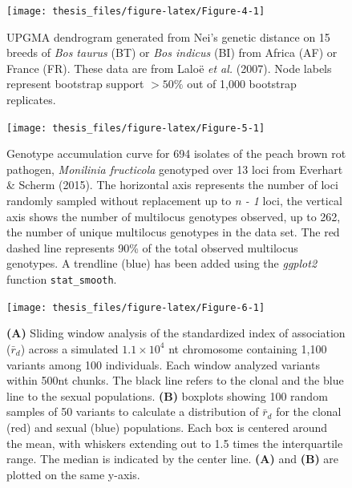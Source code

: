 \documentclass[double,12pt]{beavtex}
\begin{document}
  \newpage
  
  \begin{figure}
  
  {\centering \texttt{[image: thesis\_files/figure-latex/Figure-4-1]} 
  
  }
  
  \caption[UPGMA dendrogram generated from Nei's genetic distance]{UPGMA dendrogram generated from Nei's genetic distance on 15 breeds of
  \emph{Bos taurus} (BT) or \emph{Bos indicus} (BI) from Africa (AF) or
  France (FR). These data are from Laloë \emph{et al.} (2007). Node labels
  represent bootstrap support \(>50\%\) out of 1,000 bootstrap replicates.}\label{fig:Figure-4}
  \end{figure}
  
  \newpage
  
  \begin{figure}
  
  {\centering \texttt{[image: thesis\_files/figure-latex/Figure-5-1]} 
  
  }
  
  \caption[Genotype accumulation curve]{Genotype accumulation curve for 694 isolates of the peach brown rot
  pathogen, \emph{Monilinia fructicola} genotyped over 13 loci from
  Everhart \& Scherm (2015). The horizontal axis represents the number of
  loci randomly sampled without replacement up to \emph{n - 1} loci, the
  vertical axis shows the number of multilocus genotypes observed, up to
  262, the number of unique multilocus genotypes in the data set. The red
  dashed line represents 90\% of the total observed multilocus genotypes.
  A trendline (blue) has been added using the \emph{ggplot2} function
  \texttt{stat\_smooth}.}\label{fig:Figure-5}
  \end{figure}
  
  \newpage
  
  \begin{figure}
  
  {\centering \texttt{[image: thesis\_files/figure-latex/Figure-6-1]} 
  
  }
  
  \caption[Sliding window analysis of the standardized index of association
  (\(\bar{r}_d\))]{\textbf{(A)} Sliding window analysis of the standardized index of
  association (\(\bar{r}_d\)) across a simulated \(1.1 \times 10^4\) nt
  chromosome containing 1,100 variants among 100 individuals. Each window
  analyzed variants within 500nt chunks. The black line refers to the
  clonal and the blue line to the sexual populations. \textbf{(B)}
  boxplots showing 100 random samples of 50 variants to calculate a
  distribution of \(\bar{r}_d\) for the clonal (red) and sexual (blue)
  populations. Each box is centered around the mean, with whiskers
  extending out to 1.5 times the interquartile range. The median is
  indicated by the center line. \textbf{(A)} and \textbf{(B)} are plotted
  on the same y-axis.}\label{fig:Figure-6}
  \end{figure}
  
\end{document}
